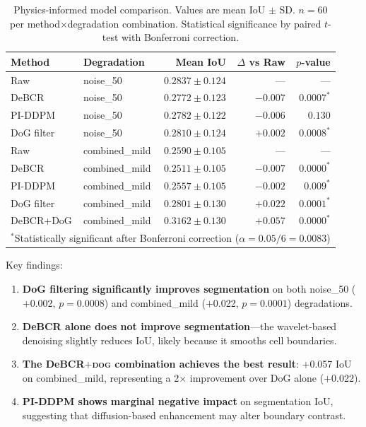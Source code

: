 \documentclass[11pt,a4paper]{article}
\newcommand{\dog}{\textsc{dog}\xspace}
\begin{document}
\begin{table}[H]
\centering
\caption{Physics-informed model comparison. Values are mean IoU
$\pm$ SD. $n{=}60$ per method$\times$degradation combination.
Statistical significance by paired $t$-test with Bonferroni correction.}
\label{tab:physics}
\begin{tabular}{@{}llrrr@{}}
\toprule
\textbf{Method} & \textbf{Degradation} & \textbf{Mean IoU} & \textbf{$\Delta$ vs Raw} & \textbf{$p$-value} \\
\midrule
Raw            & noise\_50       & $0.2837 \pm 0.124$ & --- & --- \\
DeBCR          & noise\_50       & $0.2772 \pm 0.123$ & $-0.007$ & $0.0007^*$ \\
PI-DDPM        & noise\_50       & $0.2782 \pm 0.122$ & $-0.006$ & $0.130$ \\
DoG filter     & noise\_50       & $0.2810 \pm 0.124$ & $+0.002$ & $0.0008^*$ \\
\midrule
Raw            & combined\_mild  & $0.2590 \pm 0.105$ & --- & --- \\
DeBCR          & combined\_mild  & $0.2511 \pm 0.105$ & $-0.007$ & $0.0000^*$ \\
PI-DDPM        & combined\_mild  & $0.2557 \pm 0.105$ & $-0.002$ & $0.009^*$ \\
DoG filter     & combined\_mild  & $0.2801 \pm 0.130$ & $+0.022$ & $0.0001^*$ \\
DeBCR+DoG      & combined\_mild  & $0.3162 \pm 0.130$ & $+0.057$ & $0.0000^*$ \\
\bottomrule
\multicolumn{5}{l}{\footnotesize$^*$Statistically significant after
Bonferroni correction ($\alpha = 0.05/6 = 0.0083$)}
\end{tabular}
\end{table}

Key findings:
\begin{enumerate}[nosep]
    \item \textbf{DoG filtering significantly improves segmentation} on
          both noise\_50 ($+$0.002, $p{=}0.0008$) and combined\_mild
          ($+$0.022, $p{=}0.0001$) degradations.
    \item \textbf{DeBCR alone does not improve segmentation}---the
          wavelet-based denoising slightly reduces IoU, likely because
          it smooths cell boundaries.
    \item \textbf{The DeBCR$+$\dog combination achieves the best result}:
          $+$0.057 IoU on combined\_mild, representing a 2$\times$
          improvement over DoG alone ($+$0.022).
    \item \textbf{PI-DDPM shows marginal negative impact} on segmentation
          IoU, suggesting that diffusion-based enhancement may alter
          boundary contrast.
\end{enumerate}
\end{document}
